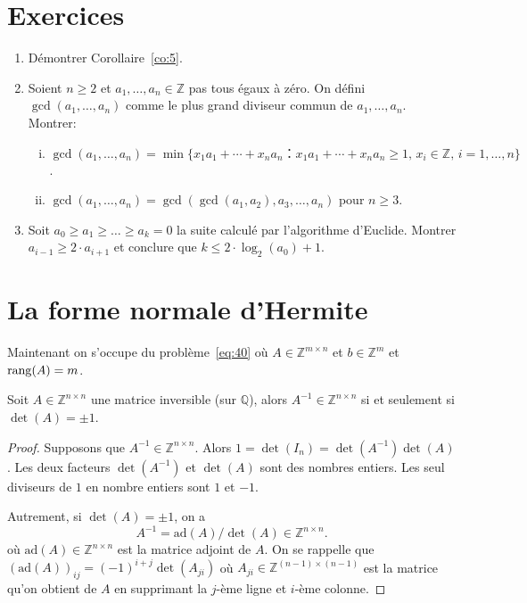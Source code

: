 \section*{Exercices}

\begin{enumerate}
\item Démontrer Corollaire~\ref{co:5}.
\item Soient $n≥2$ et $a_1,\dots,a_n∈ ℤ$ pas tous égaux à zéro. On défini $\gcd(a_1,\dots,a_n)$ comme le plus grand diviseur commun de $a_1,\dots,a_n$. Montrer: 
  \begin{enumerate}[i)]
    \item  $\gcd(a_1,\dots,a_n) =  \min\{x_1a_1+ \cdots + x_n a_n ： x_1a_1+ \cdots + x_n a_n≥1, \, x_i ∈ℤ, \, i=1,\dots,n\}$. 
  \item $\gcd(a_1,\dots,a_n) = \gcd(\gcd(a_1,a_2), a_3, \dots, a_n)$ pour $n≥3$. 
  \end{enumerate}
\item Soit $a_0≥a_1≥\dots≥a_k=0$ la suite calculé par l'algorithme d'Euclide. Montrer $a_{i-1} ≥ 2⋅ a_{i+1}$ et conclure  que $k ≤2 ⋅ \log_2(a_0)+1$.  
\end{enumerate}



\section{La forme normale d'Hermite}
\label{sec:la-forme-normale-1}

Maintenant on s'occupe du problème~\eqref{eq:40} où $A ∈ ℤ^{m ×n}$ et $b ∈ℤ^m$ et $\operatorname{rang}(A) = m$.

\begin{lemma}
  \label{lem:23}
  Soit $A ∈ℤ^{n ×n}$ une matrice inversible (sur $ℚ$), alors $A^{-1} ∈ ℤ^{n ×n}$ si et seulement si $\det(A) = \pm 1$. 
\end{lemma}

\begin{proof}
  Supposons que $A^{-1} ∈ℤ^{n ×n}$. Alors $1 = \det(I_n)  = \det(A^{-1}) \det(A)$. Les deux facteurs $\det(A^{-1})$ et $ \det(A)$ sont des nombres entiers. Les seul diviseurs de $1$ en nombre entiers sont $1$ et $-1$.

  Autrement, si $\det(A) = \pm 1$, on a
  \begin{displaymath}
    A^{-1} = \mathrm{ad}(A) / \det(A) ∈ℤ^{n ×n}. 
  \end{displaymath}
  où $\mathrm{ad}(A) ∈ ℤ^{n ×n}$ est la matrice adjoint de $A$. On se rappelle que $(\mathrm{ad}(A))_{ij} = (-1)^{i+j}\det(A_{ji})$ où $A_{ji}∈ℤ^{(n-1)×(n-1)}$ est la matrice qu'on obtient de $A$ en supprimant la $j$-ème ligne et $i$-ème colonne. 
  \end{proof}

